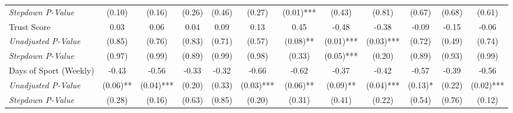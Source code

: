 \begin{tabular}{l c c c c c c c c c c c}
\quad \textit{Stepdown P-Value} & (0.10) & (0.16) & (0.26) & (0.46) & (0.27) & (0.01)*** & (0.43) & (0.81) & (0.67) & (0.68) & (0.61) \\
Trust Score & 0.03 & 0.06 & 0.04 & 0.09 & 0.13 & 0.45 & -0.48 & -0.38 & -0.09 & -0.15 & -0.06 \\
\quad \textit{Unadjusted P-Value} & (0.85) & (0.76) & (0.83) & (0.71) & (0.57) & (0.08)** & (0.01)*** & (0.03)*** & (0.72) & (0.49) & (0.74) \\
\quad \textit{Stepdown P-Value} & (0.97) & (0.99) & (0.89) & (0.99) & (0.98) & (0.33) & (0.05)*** & (0.20) & (0.89) & (0.93) & (0.99) \\
Days of Sport (Weekly) & -0.43 & -0.56 & -0.33 & -0.32 & -0.66 & -0.62 & -0.37 & -0.42 & -0.57 & -0.39 & -0.56 \\
\quad \textit{Unadjusted P-Value} & (0.06)** & (0.04)*** & (0.20) & (0.33) & (0.03)*** & (0.06)** & (0.09)** & (0.04)*** & (0.13)* & (0.22) & (0.02)*** \\
\quad \textit{Stepdown P-Value} & (0.28) & (0.16) & (0.63) & (0.85) & (0.20) & (0.31) & (0.41) & (0.22) & (0.54) & (0.76) & (0.12) \\
\bottomrule
\end{tabular}
